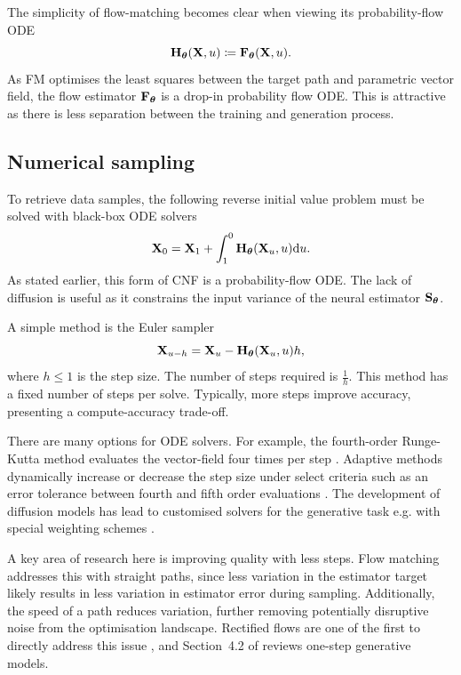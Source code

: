 The simplicity of flow-matching becomes clear when viewing its probability-flow \ac{ODE}
\[
{\mathbf{H}}_{\bm{\theta}}({\mathbf{X}},u)\coloneqq{\mathbf{F}}_{\bm{\theta}}({\mathbf{X}},u).
\]
As \ac{FM} optimises the least squares between the target path and parametric vector field, the flow estimator ${\mathbf{F}}_{\bm{\theta}}$ is a drop-in probability flow \ac{ODE}. This is attractive as there is less separation between the training and generation process.




\subsection{Numerical sampling}

To retrieve data samples, the following reverse initial value problem must be solved with black-box \ac{ODE} solvers
\[
{\mathbf{X}}_0={\mathbf{X}}_1 + \int_1^0{\mathbf{H}}_{\bm{\theta}}({\mathbf{X}}_u,u)\mathrm{d} u.
\]
As stated earlier, this form of \ac{CNF} is a probability-flow \ac{ODE}. The lack of diffusion is useful as it constrains the input variance of the neural estimator ${\mathbf{S}}_{\bm{\theta}}$.

A simple method is the Euler sampler
\[
{\mathbf{X}}_{u-h}={\mathbf{X}}_u -{\mathbf{H}}_{\bm{\theta}}({\mathbf{X}}_u,u)h,
\]
where $h\leq 1$ is the step size. The number of steps required is $\frac{1}{h}$. This method has a fixed number of steps per solve. Typically, more steps improve accuracy, presenting a compute-accuracy trade-off.

There are many options for \ac{ODE} solvers. For example, the fourth-order Runge-Kutta method evaluates the vector-field four times per step \citep{Runge1895UeberDN,kutta1901beitrag}. Adaptive methods dynamically increase or decrease the step size under select criteria such as an error tolerance between fourth and fifth order evaluations \citep{dormandFamilyEmbeddedRungeKutta1980}. The development of diffusion models has lead to customised solvers for the generative task e.g. with special weighting schemes \citep{cheng2022dpmsolvr}.

A key area of research here is improving quality with less steps. Flow matching addresses this with straight paths, since less variation in the estimator target likely results in less variation in estimator error during sampling. Additionally, the speed of a path reduces variation, further removing potentially disruptive noise from the optimisation landscape. Rectified flows are one of the first to directly address this issue \citep{liuFlowStraightFast2022a}, and Section~4.2 of \citet{peyrePDE4ML} reviews one-step generative models.

